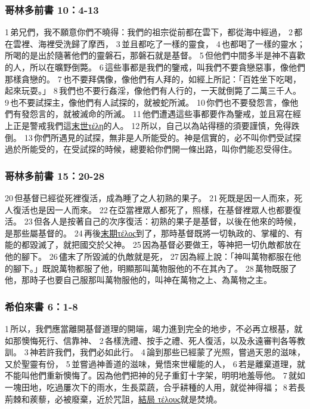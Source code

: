\subsubsection{哥林多前書 10：4-13}
1 弟兄們，我不願意你們不曉得：我們的祖宗從前都在雲下，都從海中經過， 2 都在雲裡、海裡受洗歸了摩西， 3 並且都吃了一樣的靈食， 4 也都喝了一樣的靈水；所喝的是出於隨著他們的靈磐石，那磐石就是基督。 5 但他們中間多半是神不喜歡的人，所以在曠野倒斃。 6 這些事都是我們的鑒戒，叫我們不要貪戀惡事，像他們那樣貪戀的。 7 也不要拜偶像，像他們有人拜的，如經上所記：「百姓坐下吃喝，起來玩耍。」 8 我們也不要行姦淫，像他們有人行的，一天就倒斃了二萬三千人。 9 也不要試探主，像他們有人試探的，就被蛇所滅。 10 你們也不要發怨言，像他們有發怨言的，就被滅命的所滅。 11 他們遭遇這些事都要作為鑒戒，並且寫在經上正是警戒我們這\underline{末世τέλη}的人。 12 所以，自己以為站得穩的須要謹慎，免得跌倒。 13 你們所遇見的試探，無非是人所能受的。神是信實的，必不叫你們受試探過於所能受的，在受試探的時候，總要給你們開一條出路，叫你們能忍受得住。

\subsubsection{哥林多前書 15：20-28}
20 但基督已經從死裡復活，成為睡了之人初熟的果子。 21 死既是因一人而來，死人復活也是因一人而來。 22 在亞當裡眾人都死了，照樣，在基督裡眾人也都要復活。 23 但各人是按著自己的次序復活：初熟的果子是基督，以後在他來的時候，是那些屬基督的。 24 再後\underline{末期τέλος}到了，那時基督既將一切執政的、掌權的、有能的都毀滅了，就把國交於父神。 25 因為基督必要做王，等神把一切仇敵都放在他的腳下。 26 儘末了所毀滅的仇敵就是死， 27 因為經上說：「神叫萬物都服在他的腳下。」既說萬物都服了他，明顯那叫萬物服他的不在其內了。 28 萬物既服了他，那時子也要自己服那叫萬物服他的，叫神在萬物之上、為萬物之主。

\subsubsection{希伯來書 6：1-8}
1 所以，我們應當離開基督道理的開端，竭力進到完全的地步，不必再立根基，就如那懊悔死行、信靠神、 2 各樣洗禮、按手之禮、死人復活，以及永遠審判各等教訓。 3 神若許我們，我們必如此行。 4 論到那些已經蒙了光照，嘗過天恩的滋味，又於聖靈有份， 5 並嘗過神善道的滋味，覺悟來世權能的人， 6 若是離棄道理，就不能叫他們重新懊悔了。因為他們把神的兒子重釘十字架，明明地羞辱他。 7 就如一塊田地，吃過屢次下的雨水，生長菜蔬，合乎耕種的人用，就從神得福； 8 若長荊棘和蒺藜，必被廢棄，近於咒詛，\underline{結局 τέλους}就是焚燒。



